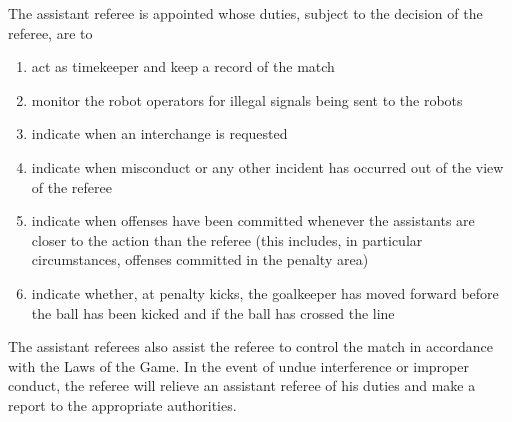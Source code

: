 \documentclass[12pt]{hurocup}
\begin{document}
\label{law:assistant-referee}

\begin{lawlist}[G]
\item The assistant referee is appointed whose duties, subject to
  the decision of the referee, are to 
  \begin{enumerate}
  \item act as timekeeper and keep a record of the match
  \item monitor the robot operators for illegal signals being sent
    to the robots
  \item indicate when an interchange is requested
  \item indicate when misconduct or any other incident has
    occurred out of the view of the referee
  \item indicate when offenses have been committed whenever the
    assistants are closer to the action than the referee (this
    includes, in particular circumstances, offenses committed in
    the penalty area)
  \item indicate whether, at penalty kicks, the goalkeeper has
    moved forward before the ball has been kicked and if the ball
    has crossed the line
  \end{enumerate}
  
\item The assistant referees also assist the referee to control
  the match in accordance with the Laws of the Game. In the event
  of undue interference or improper conduct, the referee will
  relieve an assistant referee of his duties and make a report to
  the appropriate authorities.
\end{lawlist}
\end{document}
